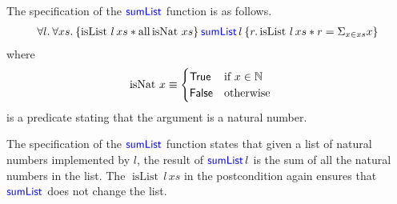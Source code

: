 The specification of the $\textsf{\color{blue} sumList}$ function is as follows.
\begin{align*}
\All l. \All xs.
  \hoare{ \operatorname{isList} \, l\, xs \ast \operatorname{all} \operatorname{isNat}\, xs}{\langkw{sumList} \, l}{r.  \operatorname{isList} \, l\, xs \ast r = \Sigma_{x \in xs} x}
\end{align*}
where 
\begin{align*}
\operatorname{isNat} \, x &\equiv \begin{cases} \textsf{\upshape True} & \text{if } x \in \mathbb{N} \\
																			\textsf{\upshape False} & \text{otherwise } \end{cases}
\end{align*}
is a predicate stating that the argument is a natural number.

The specification of the $\textsf{\color{blue} sumList}$ function states that given a list of natural numbers implemented by $l$, the result of $\textsf{\color{blue} sumList}\,l$ is the sum of all the natural numbers in the list.
The $\operatorname{isList} \, l\, xs$ in the postcondition again ensures that $\textsf{\color{blue} sumList}$ does not change the list.


